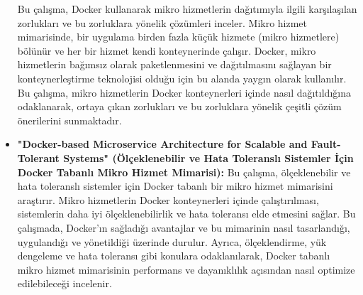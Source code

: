 \begin{itemize}
Bu çalışma, Docker kullanarak mikro hizmetlerin dağıtımıyla ilgili karşılaşılan zorlukları ve bu zorluklara yönelik çözümleri inceler. Mikro hizmet mimarisinde, bir uygulama birden fazla küçük hizmete (mikro hizmetlere) bölünür ve her bir hizmet kendi konteynerinde çalışır. Docker, mikro hizmetlerin bağımsız olarak paketlenmesini ve dağıtılmasını sağlayan bir konteynerleştirme teknolojisi olduğu için bu alanda yaygın olarak kullanılır. Bu çalışma, mikro hizmetlerin Docker konteynerleri içinde nasıl dağıtıldığına odaklanarak, ortaya çıkan zorlukları ve bu zorluklara yönelik çeşitli çözüm önerilerini sunmaktadır.
\item \textbf{"Docker-based Microservice Architecture for Scalable and Fault-Tolerant Systems" (Ölçeklenebilir ve Hata Toleranslı Sistemler İçin Docker Tabanlı Mikro Hizmet Mimarisi):}
Bu çalışma, ölçeklenebilir ve hata toleranslı sistemler için Docker tabanlı bir mikro hizmet mimarisini araştırır. Mikro hizmetlerin Docker konteynerleri içinde çalıştırılması, sistemlerin daha iyi ölçeklenebilirlik ve hata toleransı elde etmesini sağlar. Bu çalışmada, Docker'ın sağladığı avantajlar ve bu mimarinin nasıl tasarlandığı, uygulandığı ve yönetildiği üzerinde durulur. Ayrıca, ölçeklendirme, yük dengeleme ve hata toleransı gibi konulara odaklanılarak, Docker tabanlı mikro hizmet mimarisinin performans ve dayanıklılık açısından nasıl optimize edilebileceği incelenir.\\
\end{itemize}
